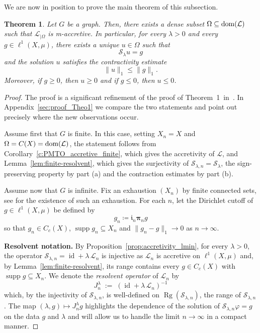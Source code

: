 \documentclass[letterpaper]{article}
\newtheorem{theorem}[lemma]{Theorem}
\theoremstyle{definition}
\theoremstyle{named}
\numberwithin{equation}{section}
\newcommand{\lm}{\lambda}
\newcommand{\dom}{\textnormal{dom}} %
\newcommand{\id}{\operatorname{id}}
\newcommand{\Deltaphi}{\mathcal{L}}
\newcommand{\Lmin}{\mathcal{L}_{n}}
\begin{document}
We are now in position to prove the main theorem of this subsection.
\begin{theorem}\label{thm:new}
Let $G$ be a  graph. Then, there exists a dense subset $\Omega\subseteq\dom(\Deltaphi)$ such that $\Deltaphi_{|\Omega}$ is m-accretive. In particular, for every $\lambda>0$ and 
every $g\in \ell^{1}(X,\mu)$, there exists a unique $u\in \Omega$ such that
\[
\mathcal{S}_\lambda u=g
\]
and the solution $u$ satisfies the contractivity estimate
\[
\|u\|_1\leq \|g\|_1.
\]
Moreover, if $g\geq 0$, then $u\geq 0$ and if $g\leq 0$, then $u\leq 0$.
\end{theorem}
\begin{proof}
The proof is a significant refinement of the proof of Theorem~1~in~\cite{bianchi2022generalized}.  In Appendix~\ref{sec:proof_Theo1} we compare the two statements and  point out precisely where the new observations occur.

Assume first that $G$ is finite.  In this case, setting $X_n = X$ and $\Omega = C(X)=\dom(\Deltaphi)$, the statement follows from Corollary~\ref{c:PMTO_accretive_finite},
which gives the accretivity of $\Deltaphi$, and Lemma~\ref{lem:finite-resolvent}, 
which gives the surjectivity of $\mathcal{S}_{\lambda,n} = \mathcal{S}_\lambda$, 
the sign-preserving property by part (a) and the contraction estimates by part (b).

Assume now that $G$ is infinite. Fix an exhaustion $(X_n)$ by finite connected sets,  
see \cite[Lemma A.4]{bianchi2022generalized} for the existence of such an exhaustion. 
For each $n$, let the Dirichlet cutoff of $g \in \ell^1(X,\mu)$ be defined by
$$g_n \coloneqq \boldsymbol{\mathfrak{i}}_n \boldsymbol{\pi}_n g$$
so that $g_n \in C_c(X)$, $\operatorname{supp}g_n \subseteq X_n$
and $ \|g_n - g\|_1 \to 0$ as $n \to \infty$.

\medskip
\noindent\textbf{Resolvent notation.}
By Proposition~\ref{prop:accretivity_lmin}, for every $\lambda>0$, the 
operator $\mathcal{S}_{\lambda,n}=\id+\lambda\,\Lmin$ is injective as
$\Lmin$ is accretive on $\ell^1(X,\mu)$ and, 
by Lemma~\ref{lem:finite-resolvent}, its range contains every $g\in C_c(X)$ with $\operatorname{supp} g\subseteq X_n$. We denote the \emph{resolvent operator} of $\Lmin$ by
\[
J^\lambda_n \;:=\; (\id+\lambda\,\Lmin)^{-1}
\]
which, by the injectivity of $\mathcal{S}_{\lambda,n}$,
is well-defined on $\operatorname{Rg}(\mathcal{S}_{\lambda,n})$, the range
of $\mathcal{S}_{\lambda,n}$. The map $(\lambda,g)\mapsto J^\lambda_n g$ highlights the dependence of the solution of $\mathcal{S}_{\lambda,n}\varphi=g$ on the data $g$ and $\lm$
and will allow us to handle the limit $n\to\infty$ in a compact manner.


\end{proof}
\end{document}
